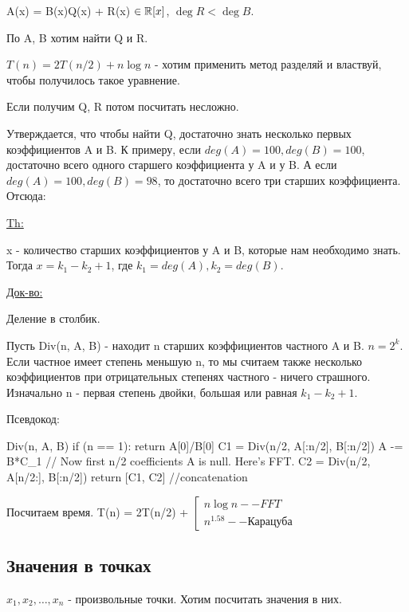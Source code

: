 A(x) = B(x)Q(x) + R(x) $\in \mathbb{R}[x]$, $\deg R < \deg B$.

По A, B хотим найти Q и R.

$T(n) = 2T(n/2) + n \log n$ - хотим применить метод разделяй и властвуй, чтобы получилось такое уравнение.

Если получим Q, R потом посчитать несложно.

Утверждается, что чтобы найти Q, достаточно знать несколько первых коэффициентов A и B. К примеру, если $deg(A) = 100, deg(B) = 100$, достаточно всего одного старшего коэффициента у A и у B. А если $deg(A) = 100, deg(B) = 98$, то достаточно всего три старших коэффициента. Отсюда:

\underline{Th:}

x - количество старших коэффициентов у A и B, которые нам необходимо знать. Тогда $x = k_1 - k_2 + 1$, где $k_1 = deg(A), k_2 = deg(B)$.

\underline{Док-во:}

Деление в столбик.

Пусть Div(n, A, B) - находит n старших коэффициентов частного A и B. $n = 2^k$. Если частное имеет степень меньшую n, то мы считаем также несколько коэффициентов при отрицательных степенях частного - ничего страшного. Изначально n - первая степень двойки, большая или равная $k_1 - k_2 + 1$.

Псевдокод:

\begin{cppcode}
Div(n, A, B) {
    if (n == 1): return A[0]/B[0]
    C1 = Div(n/2, A[:n/2], B[:n/2])
    A -= B*C_1 // Now first n/2 coefficients A is null. Here's FFT.
    C2 = Div(n/2, A[n/2:], B[:n/2])
    return [C1, C2] //concatenation 
}
\end{cppcode}

Посчитаем время. T(n) = 2T(n/2) + $\left[ \begin{gathered} 
                                        n \log n -- FFT \\
                                        n^{1.58} -- \text{Карацуба}
                                        \end{gathered}
                                \right.$
                                
\subsection{Значения в точках}

$x_1, x_2, \dots, x_n$ - произвольные точки. Хотим посчитать значения в них.

